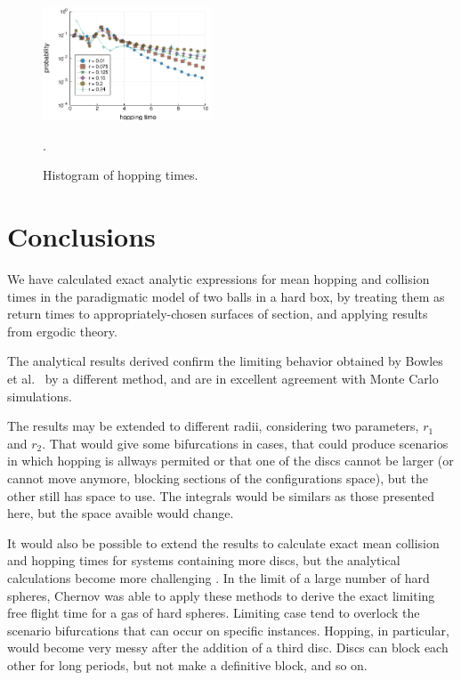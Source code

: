 \documentclass[superscriptaddress,pre,reprint,showpacs,twocolumn]{revtex4-1}
\newcommand{\etal}{et al.\ }
\begin{document}
\begin{figure}[h]
  \centering
  \includegraphics[width=0.45\textwidth]{figures/histogram_hopping_times.pdf}
  \caption{Histogram of hopping times.}
    \label{histogram_hopping}.
\end{figure}


\section{Conclusions}

We have calculated exact analytic expressions for mean hopping and
collision times in the paradigmatic model of two balls in a hard box,
by treating them as return times to  appropriately-chosen surfaces of section, 
and applying results from ergodic theory.

The analytical results derived 
confirm the limiting behavior obtained
by Bowles \etal \cite{Bowles04} by a different method,
and are in excellent agreement with Monte Carlo simulations.

The results may be extended to different radii, considering two parameters,
$r_1$ and $r_2$. That would give some bifurcations in cases, that could
produce scenarios in which hopping is allways permited or that one of the
discs cannot be larger (or cannot move anymore,
blocking sections of the configurations space), but the other still has space to use.
The integrals would be similars as those presented here, but the space avaible
would change. 

It would also be possible to extend the results to calculate exact mean collision
and hopping times for systems containing more discs,
but the analytical calculations become more challenging \cite{three_hard_discs_2004}.
In the limit of a large number of hard spheres, Chernov \cite{Chernov97}
was able to apply these methods to derive the exact limiting  free flight time for a gas of hard spheres. Limiting case tend to overlock the scenario bifurcations that
can occur on specific instances. Hopping, in particular, would become very
messy after the addition of a third disc. Discs can block each other for long periods,
but not make a definitive block, and so on.
\end{document}
